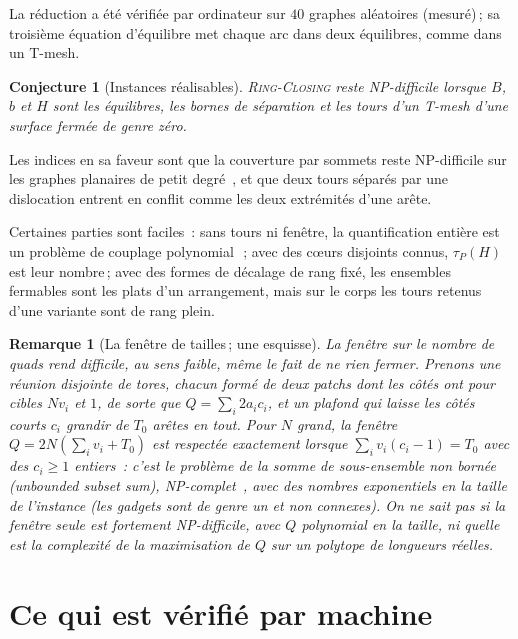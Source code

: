\documentclass[11pt,a4paper]{article}
\newtheorem{remark}{Remarque}
\newtheorem{conjecture}{Conjecture}
\newcommand{\RC}{\textup{\textsc{Ring-Closing}}}
\begin{document}
La réduction a été vérifiée par ordinateur sur $40$ graphes aléatoires
(mesuré)\,; sa troisième équation d'équilibre met chaque arc dans deux
équilibres, comme dans un T-mesh.

\begin{conjecture}[Instances réalisables]\label{conj:realize}
\RC{} reste NP-difficile lorsque $B$, $b$ et $H$ sont les équilibres, les
bornes de séparation et les tours d'un T-mesh d'une surface fermée de genre
zéro.
\end{conjecture}

Les indices en sa faveur sont que la couverture par sommets reste
NP-difficile sur les graphes planaires de petit
degré~\cite{garey1976simplified}, et que deux tours séparés par une
dislocation entrent en conflit comme les deux extrémités d'une arête.

Certaines parties sont faciles~: sans tours ni fenêtre, la quantification
entière est un problème de couplage polynomial~\cite{edmonds1970matching}\,;
avec des cœurs disjoints connus, $\tau_P(H)$ est leur nombre\,; avec des
formes de décalage de rang fixé, les ensembles fermables sont les plats d'un
arrangement, mais sur le corps les tours retenus d'une variante sont de rang
plein.

\begin{remark}[La fenêtre de tailles\,; une esquisse]
La fenêtre sur le nombre de quads rend difficile, au sens faible, même le
fait de ne rien fermer. Prenons une réunion disjointe de tores, chacun formé
de deux patchs dont les côtés ont pour cibles $N v_i$ et $1$, de sorte que $Q
= \sum_i 2 a_i c_i$, et un plafond qui laisse les côtés courts $c_i$ grandir
de $T_0$ arêtes en tout. Pour $N$ grand, la fenêtre $Q = 2N(\sum_i v_i +
T_0)$ est respectée exactement lorsque $\sum_i v_i(c_i - 1) = T_0$ avec des
$c_i \ge 1$ entiers~: c'est le problème de la somme de sous-ensemble non
bornée (\emph{unbounded subset sum}), NP-complet~\cite{lueker1975two}, avec
des nombres exponentiels en la taille de l'instance (les gadgets sont de genre
un et non connexes). On ne sait pas si la fenêtre seule est fortement
NP-difficile, avec $Q$ polynomial en la taille, ni quelle est la complexité de
la maximisation de $Q$ sur un polytope de longueurs réelles.
\end{remark}

\section{Ce qui est vérifié par machine}\label{sec:lean}
\end{document}
